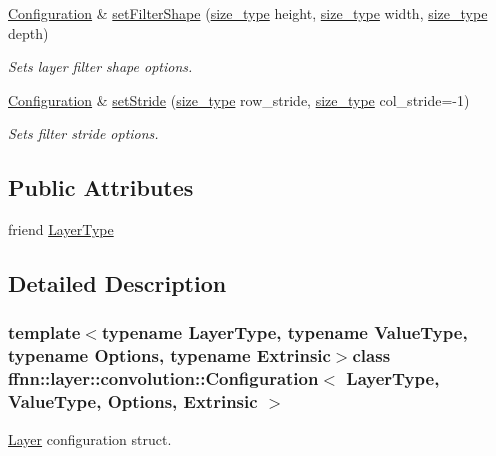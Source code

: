 \begin{DoxyCompactItemize}
\hyperlink{classffnn_1_1layer_1_1convolution_1_1_configuration}{Configuration} \& \hyperlink{classffnn_1_1layer_1_1convolution_1_1_configuration_aa28ac2eeb2c151c9eac8580ad1aa2bd8}{set\-Filter\-Shape} (\hyperlink{namespaceffnn_a63b90a2fd70eb76684eac482a51633e5}{size\-\_\-type} height, \hyperlink{namespaceffnn_a63b90a2fd70eb76684eac482a51633e5}{size\-\_\-type} width, \hyperlink{namespaceffnn_a63b90a2fd70eb76684eac482a51633e5}{size\-\_\-type} depth)
\begin{DoxyCompactList}\small\item\em Sets layer filter shape options. \end{DoxyCompactList}\item 
\hyperlink{classffnn_1_1layer_1_1convolution_1_1_configuration}{Configuration} \& \hyperlink{classffnn_1_1layer_1_1convolution_1_1_configuration_ad870ec83ea571443bef8a6faa676bab6}{set\-Stride} (\hyperlink{namespaceffnn_a63b90a2fd70eb76684eac482a51633e5}{size\-\_\-type} row\-\_\-stride, \hyperlink{namespaceffnn_a63b90a2fd70eb76684eac482a51633e5}{size\-\_\-type} col\-\_\-stride=-\/1)
\begin{DoxyCompactList}\small\item\em Sets filter stride options. \end{DoxyCompactList}\end{DoxyCompactItemize}
\subsection*{Public Attributes}
\begin{DoxyCompactItemize}
\item 
friend \hyperlink{classffnn_1_1layer_1_1convolution_1_1_configuration_a12e530507865f85db9b75c2d78493442}{Layer\-Type}
\end{DoxyCompactItemize}


\subsection{Detailed Description}
\subsubsection*{template$<$typename Layer\-Type, typename Value\-Type, typename Options, typename Extrinsic$>$class ffnn\-::layer\-::convolution\-::\-Configuration$<$ Layer\-Type, Value\-Type, Options, Extrinsic $>$}

\hyperlink{classffnn_1_1layer_1_1_layer}{Layer} configuration struct. 

